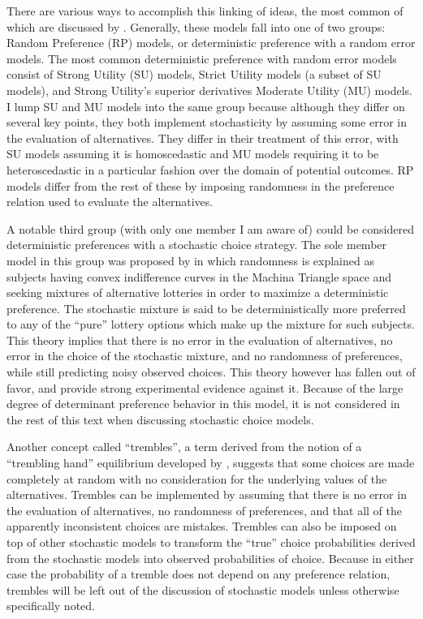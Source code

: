 \documentclass[../main.tex]{subfiles}
\begin{document}
There are various ways to accomplish this linking of ideas, the most common of which are discussed by \textcite{Wilcox2008}.
Generally, these models fall into one of two groups: Random Preference (RP) models, or deterministic preference with a random error models.
The most common deterministic preference with random error models consist of Strong Utility (SU) models, Strict Utility models (a subset of SU models), and Strong Utility's superior derivatives Moderate Utility (MU) models.
I lump SU and MU models into the same group because although they differ on several key points, they both implement stochasticity by assuming some error in the evaluation of alternatives.
They differ in their treatment of this error, with SU models assuming it is homoscedastic and MU models requiring it to be heteroscedastic in a particular fashion over the domain of potential outcomes.
RP models differ from the rest of these by imposing randomness in the preference relation used to evaluate the alternatives.

A notable third group (with only one member I am aware of) could be considered deterministic preferences with a stochastic choice strategy.
The sole member model in this group was proposed by \textcite{Machina1985} in which randomness is explained as subjects having convex indifference curves in the Machina Triangle space \textcite{Machina1987} and seeking mixtures of alternative lotteries in order to maximize a deterministic preference.
The stochastic mixture is said to be deterministically more preferred to any of the \enquote{pure} lottery options which make up the mixture for such subjects.
This theory implies that there is no error in the evaluation of alternatives, no error in the choice of the stochastic mixture, and no randomness of preferences, while still predicting noisy observed choices.
This theory however has fallen out of favor, and \textcite{Hey1995} provide strong experimental evidence against it.
Because of the large degree of determinant preference behavior in this model, it is not considered in the rest of this text when discussing stochastic choice models.

Another concept called \enquote{trembles}, a term derived from the notion of a \enquote{trembling hand} equilibrium developed by \textcite{Selten1975}, suggests that some choices are made completely at random with no consideration for the underlying values of the alternatives.
Trembles can be implemented by assuming that there is no error in the evaluation of alternatives, no randomness of preferences, and that all of the apparently inconsistent choices are mistakes.
Trembles can also be imposed on top of other stochastic models to transform the \enquote{true} choice probabilities derived from the stochastic models into observed probabilities of choice.
Because in either case the probability of a tremble does not depend on any preference relation, trembles will be left out of the discussion of stochastic models unless otherwise specifically noted.
\end{document}
